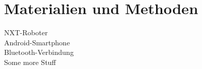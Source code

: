 \chapter{Materialien und Methoden}
\label{cha:Materials}

NXT-Roboter\\

Android-Smartphone\\

Bluetooth-Verbindung\\

Some more Stuff\\

